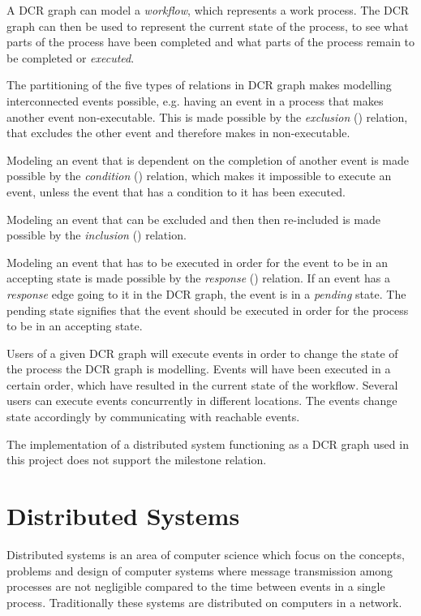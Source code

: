	A DCR graph can model a \textit{workflow}, which represents a work process. The DCR graph can then be used to represent the current state of the process, to see what parts of the process have been completed and what parts of the process remain to be completed or \textit{executed}. 
	
	The partitioning of the five types of relations in DCR graph makes modelling interconnected events possible, e.g. having an event in a process that makes another event non-executable. This is made possible by the \textit{exclusion} (\exclusion) relation, that excludes the other event and therefore makes in non-executable. 
	
	Modeling an event that is dependent on the completion of another event is made possible by the \textit{condition} (\condition) relation, which makes it impossible to execute an event, unless the event that has a condition to it has been executed.
	
	Modeling an event that can be excluded and then then re-included is made possible by the \textit{inclusion} (\inclusion) relation. 
	
	Modeling an event that has to be executed in order for the event to be in an accepting state  is made possible by the \textit{response} (\response) relation. If an event has a \textit{response} edge going to it in the DCR graph, the event is in a \textit{pending} state. The pending state signifies that the event should be executed in order for the process to be in an accepting state.
	
	Users of a given DCR graph will execute events in order to change the state of the process the DCR graph is modelling. Events will have been executed in a certain order, which have resulted in the current state of the workflow. Several users can execute events concurrently in different locations. The events change state accordingly by communicating with reachable events. 
	
	The implementation of a distributed system functioning as a DCR graph used in this project does not support the milestone relation. 
	
	\section{Distributed Systems}
		Distributed systems is an area of computer science which focus on the concepts, problems and design of computer systems where message transmission among processes are not negligible compared to the time between events in a single process. Traditionally these systems are distributed on computers in a network.
		
